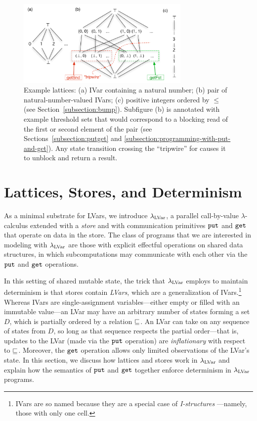 \begin{figure}[tb]
\centering
\includegraphics[width=3.3in,natwidth=633px,natheight=319px]{chapter2/figures/ExampleLattices2.pdf} 
  \caption{\footnotesize Example lattices: (a) IVar
    containing a natural number; (b) pair of natural-number-valued IVars; (c)
    positive integers ordered by $\leq$ (see Section~\ref{subsection:bump}).
    Subfigure (b) is annotated with example threshold
    sets that would correspond to a blocking read of the first or
    second element of the pair (see Sections~\ref{subsection:putget} and \ref{subsection:programming-with-put-and-get}).
    Any state transition crossing the
    ``tripwire'' for  causes it to unblock
    and return a result.}

  \label{f:lattice-examples}
\end{figure}

\section{Lattices, Stores, and Determinism}\label{section:domains}

As a minimal substrate for LVars, we introduce $\lambda_{\textrm{LVar}}$, 
 a parallel call-by-value
$\lambda$-calculus extended with a {\em store} and with communication
primitives $\mbox{\texttt{put}}$ and $\mbox{\texttt{get}}$ that operate on data in the store.
The class of programs that we are interested in modeling with
$\lambda_{\textrm{LVar}}$ are those with explicit effectful operations on shared
data
structures, in which subcomputations may communicate with each other
via the $\mbox{\texttt{put}}$ and
$\mbox{\texttt{get}}$ operations.

In this setting of shared mutable state, the trick
that $\lambda_{\textrm{LVar}}$ employs to maintain determinism is that stores
contain {\em LVars}, which are a generalization of
IVars.\footnote{IVars are so named because they are a
    special case of {\em I-structures} \cite{IStructures}---namely,
    those with only one cell.}
Whereas IVars are single-assignment
variables---either empty or filled with an immutable value---an LVar
may have an arbitrary number of states forming a set $D$, which is partially ordered by a relation 
$\sqsubseteq$.  An LVar can take on any sequence of states from 
$D$, so long as that sequence respects the partial order---that is,
updates to the LVar (made via the $\mbox{\texttt{put}}$ operation) are
\emph{inflationary} %
 with respect to $\sqsubseteq$.  Moreover, the 
 $\mbox{\texttt{get}}$ operation allows only limited observations of the LVar's state.  In
this section, we discuss how lattices and stores work in $\lambda_{\textrm{LVar}}$
and explain how the semantics of $\mbox{\texttt{put}}$ and $\mbox{\texttt{get}}$ together enforce determinism
in $\lambda_{\textrm{LVar}}$ programs.

